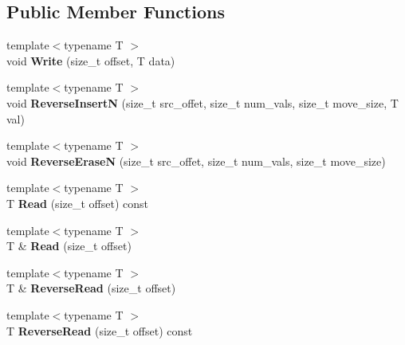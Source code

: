 \subsection*{Public Member Functions}
\begin{DoxyCompactItemize}
\item 
\mbox{\label{struct_page_abbaec6349db3fab911f7469560b62924}} 
{\footnotesize template$<$typename T $>$ }\\void {\bfseries Write} (size\+\_\+t offset, T data)
\item 
\mbox{\label{struct_page_abd4af8f423f3e6b5a384818311c747a9}} 
{\footnotesize template$<$typename T $>$ }\\void {\bfseries Reverse\+InsertN} (size\+\_\+t src\+\_\+offet, size\+\_\+t num\+\_\+vals, size\+\_\+t move\+\_\+size, T val)
\item 
\mbox{\label{struct_page_ac0ff24c1e52fc2048e3dfa49c44d0bde}} 
{\footnotesize template$<$typename T $>$ }\\void {\bfseries Reverse\+EraseN} (size\+\_\+t src\+\_\+offet, size\+\_\+t num\+\_\+vals, size\+\_\+t move\+\_\+size)
\item 
\mbox{\label{struct_page_ab92d8b7e74b9dc5b2c83522218bce302}} 
{\footnotesize template$<$typename T $>$ }\\T {\bfseries Read} (size\+\_\+t offset) const
\item 
\mbox{\label{struct_page_a51c4c8f51e68aa8b7531fa135f9e6231}} 
{\footnotesize template$<$typename T $>$ }\\T \& {\bfseries Read} (size\+\_\+t offset)
\item 
\mbox{\label{struct_page_ac659c4447685cf240004cecc7f9737e6}} 
{\footnotesize template$<$typename T $>$ }\\T \& {\bfseries Reverse\+Read} (size\+\_\+t offset)
\item 
\mbox{\label{struct_page_a8c331f7f7d0dd6d39966a04ae76f14b9}} 
{\footnotesize template$<$typename T $>$ }\\T {\bfseries Reverse\+Read} (size\+\_\+t offset) const
\item 
\mbox{\label{struct_page_abee1e69bf983c893f9ce8c377f6eed08}} 

\end{DoxyCompactItemize}
